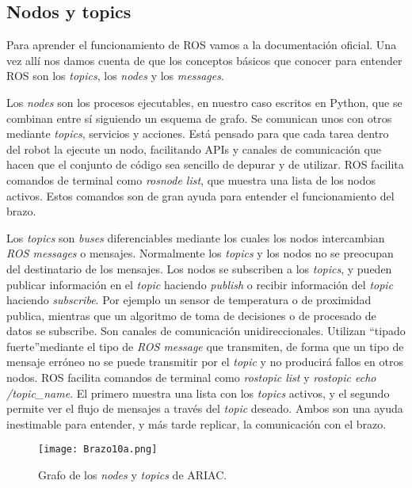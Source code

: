 \subsection{Nodos y topics}
\label{subsec:br_nodosytopics}

Para aprender el funcionamiento de ROS vamos a la documentación oficial\cite{roswiki}. Una vez allí nos damos cuenta de que los conceptos básicos que conocer para entender ROS son los \textit{topics}, los \textit{nodes} y  los \textit{messages}. 

Los \textit{nodes} son los procesos ejecutables, en nuestro caso escritos en Python, que se combinan entre sí siguiendo un esquema de grafo. Se comunican unos con otros mediante \textit{topics}, servicios y acciones. Está pensado para que cada tarea dentro del robot la ejecute un nodo, facilitando APIs y canales de comunicación que hacen que el conjunto de código sea sencillo de depurar y de utilizar. ROS facilita comandos de terminal como \textit{rosnode list}, que muestra una lista de los nodos activos. Estos comandos son de gran ayuda para entender el funcionamiento del brazo.

Los \textit{topics} son \textit{buses} diferenciables mediante los cuales los nodos intercambian \textit{ROS messages} o mensajes. Normalmente los \textit{topics} y los nodos no se preocupan del destinatario de los mensajes. Los nodos se subscriben a los \textit{topics}, y pueden publicar información en el \textit{topic} haciendo \textit{publish} o recibir información del \textit{topic} haciendo \textit{subscribe}. Por ejemplo un sensor de temperatura o de proximidad publica, mientras que un algoritmo de toma de decisiones o de procesado de datos se subscribe. Son canales de comunicación unidireccionales. Utilizan \textquotedblleft tipado fuerte\textquotedblright  mediante el tipo de \textit{ROS message} que transmiten, de forma que un tipo de mensaje erróneo no se puede transmitir por el \textit{topic} y no producirá fallos en otros nodos. ROS facilita comandos de terminal como \textit{rostopic list} y \textit{rostopic echo /topic\_name}. El primero muestra una lista con los \textit{topics} activos, y el segundo permite ver el flujo de mensajes a través del \textit{topic} deseado. Ambos son una ayuda inestimable para entender, y más tarde replicar, la comunicación con el brazo.

\begin{figure}[]
	\centering\texttt{[image: Brazo10a.png]}
	\caption{Grafo de los \textit{nodes} y \textit{topics} de ARIAC.}
	\label{fig:ariacgraph1}
\end{figure}

